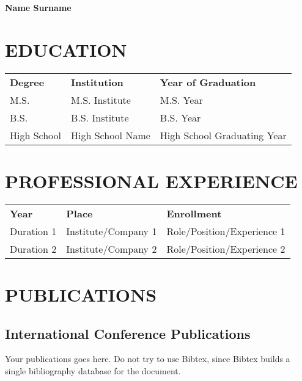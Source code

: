 \curriculumvitae
\label{chapter:vita}

{\large \textbf{Name Surname}}

\section*{\uppercase{Education}}

\begin{tabular}{lll}
\textbf{Degree} & \textbf{Institution} & \textbf{Year of Graduation} \\
M.S. & M.S. Institute & M.S. Year \\
B.S. & B.S. Institute & B.S. Year \\
High School & High School Name & High School Graduating Year
\end{tabular}

\section*{\uppercase{Professional Experience}}

\begin{tabular}{lll}
\textbf{Year} & \textbf{Place} & \textbf{Enrollment} \\
Duration 1 & Institute/Company 1 & Role/Position/Experience 1 \\
Duration 2 & Institute/Company 2 & Role/Position/Experience 2 
\end{tabular}

\section*{\uppercase{Publications}}
\subsection*{International Conference Publications}
Your publications goes here. Do not try to use Bibtex, since Bibtex builds a single bibliography
database for the document.
